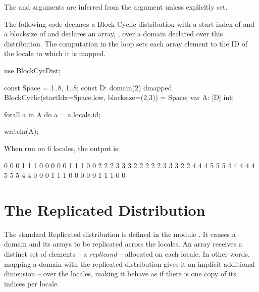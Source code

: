 
The  and  arguments are inferred from the
 argument unless explicitly set.

\begin{example}
The following code declares a Block-Cyclic distribution with a start index
of  and a blocksize of  and declares an array, , over a domain
declared over this distribution.  The computation in the 
loop sets each array element to the ID of the locale to which it is
mapped.
\begin{chapel}
use BlockCycDist;

const Space = {1..8, 1..8};
const D: domain(2) dmapped BlockCyclic(startIdx=Space.low, 
                                       blocksize=(2,3)) 
       = Space;
var A: [D] int;

forall a in A do
  a = a.locale.id;

writeln(A);
\end{chapel}
When run on 6 locales, the output is:
\begin{chapel}
0 0 0 1 1 1 0 0
0 0 0 1 1 1 0 0
2 2 2 3 3 3 2 2
2 2 2 3 3 3 2 2
4 4 4 5 5 5 4 4
4 4 4 5 5 5 4 4
0 0 0 1 1 1 0 0
0 0 0 1 1 1 0 0
\end{chapel}
\end{example}


\section{The Replicated Distribution}
\label{Replicated_Dist}

The standard Replicated distribution is defined in the module
.
It causes a domain and its arrays to be replicated across the locales.
An array receives a distinct set of elements -- a \emph{replicand} --
allocated on each locale.
%
In other words, mapping a domain with the replicated distribution gives it
an implicit additional dimension -- over the locales,
making it behave as if there is one copy of its indices per locale.


